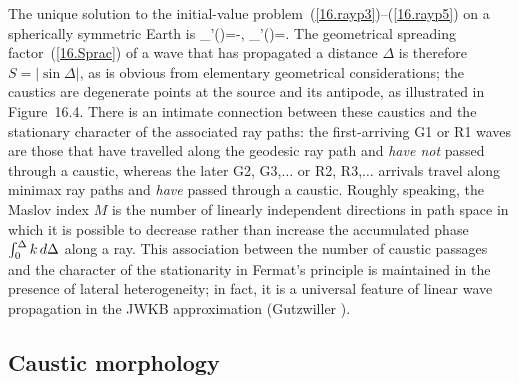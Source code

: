 The unique solution to the initial-value
problem~(\ref{16.rayp3})--(\ref{16.rayp5}) on a
spherically symmetric Earth is
\eq \label{16.dynrtspher}
\p_{\zeta'}\theta(\phi)=-\sin\phi,
\qquad
\p_{\zeta'}\zeta(\phi)=\cos\phi.
\en
The geometrical spreading factor~(\ref{16.Sprac})
of a wave that has propagated a distance $\Delta$
is therefore $S=|\sin\Delta|$, as is obvious from
elementary geometrical considerations; the
caustics are degenerate points at the source
and its antipode, as illustrated in
Figure~16.4.
There is an intimate connection between these caustics
and the stationary character of the associated
ray paths: the first-arriving G1 or R1 waves are those
that have travelled along the geodesic ray path
and {\em have not\/} passed through a caustic,
whereas the later G2, G3,\hspace{0.2mm}$\ldots$ or
R2, R3,\hspace{0.2mm}$\ldots$ arrivals travel along minimax
ray paths and {\em have\/} passed through a caustic.
Roughly speaking, the Maslov index $M$ is
the number of linearly independent directions
in path space in which it is possible
to decrease rather than increase
the accumulated phase $\int_0^{\raise-.25ex\hbox{$\scriptstyle\Delta$}}
k\,d\Delta$ along a ray.  This association
between the number of caustic passages and
the character of the stationarity in Fermat's
principle is maintained in the presence of
lateral heterogeneity; in fact, it is a universal
feature of linear wave propagation in the JWKB
approximation (Gutzwiller \citeyear{gutzwiller90}).
%
%
%

\renewcommand{\thesubsection}{$\!\!\!\raise1.3ex\hbox{$\star$}\!\!$
\arabic{chapter}.\arabic{section}.\arabic{subsection}}
\subsection{Caustic morphology}
%
\renewcommand{\thesubsection}{\arabic{chapter}.\arabic{section}.\arabic{subsection}}

